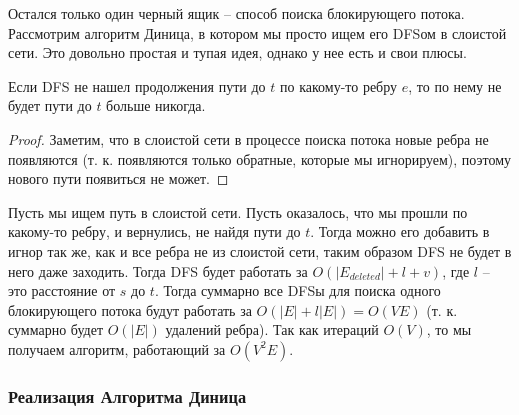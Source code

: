 \noindent Остался только один черный ящик -- способ поиска блокирующего потока. Рассмотрим алгоритм Диница, в котором мы просто ищем его DFSом в слоистой сети. Это довольно простая и тупая идея, однако у нее есть и свои плюсы.

\begin{proposition}
    Если DFS не нашел продолжения пути до $t$ по какому-то ребру $e$, то по нему не будет пути до $t$ больше никогда.
\end{proposition}

\begin{proof}
    Заметим, что в слоистой сети в процессе поиска потока новые ребра не появляются (т. к. появляются только обратные, которые мы игнорируем), поэтому нового пути появиться не может.
\end{proof}

\begin{corollary}
    Пусть мы ищем путь в слоистой сети. Пусть оказалось, что мы прошли по какому-то ребру, и вернулись, не найдя пути до $t$. Тогда можно его добавить в игнор так же, как и все ребра не из слоистой сети, таким образом DFS не будет в него даже заходить. Тогда DFS будет работать за $O(|E_{deleted}| + l + v)$, где $l$ -- это расстояние от $s$ до $t$. Тогда суммарно все DFSы для поиска одного блокирующего потока будут работать за $O(|E| + l|E|) = O(VE)$ (т. к. суммарно будет $O(|E|)$ удалений ребра). Так как итераций $O(V)$, то мы получаем алгоритм, работающий за $O(V^2E)$.
\end{corollary}

\subsubsection{Реализация Алгоритма Диница}

